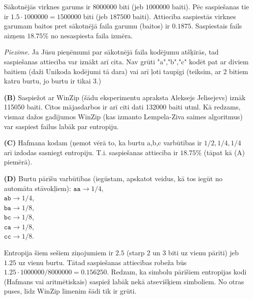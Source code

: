 \documentclass[a4paper]{article}
\begin{document}
Sākotnējās virknes garums ir $8000000$ biti (jeb $1000000$ baiti). 
Pēc saspiešanas tie ir $1.5 \cdot 1000000 = 1500000$ biti 
(jeb $187500$ baiti). 
Attiecība saspiestās virknes garumam baitos pret sākotnējā faila garumu (baitos) 
ir $0.1875$. Saspiestais fails aizņem $18.75\%$ 
no nesaspiesta faila izmēra.

{\em Piezīme.} Ja Jūsu pieņēmumi par sākotnējā faila kodējumu atšķīrās, tad
saspiešanas attiecība var iznākt arī cita. 
Nav grūti "a","b","c" kodēt pat ar diviem baitiem (daži 
Unikoda kodējumi tā dara) vai arī ļoti taupīgi (teiksim, ar 2 bitiem katru burtu, 
jo burtu ir tikai $3$.) 

{\bf (B)} Saspiežot ar WinZip (šādu eksperimentu apraksta
Aleksejs Jelisejevs) iznāk 115050 baiti. Citos 
mājasdarbos ir arī citi dati 132000 baiti utml. 
Kā redzams, vismaz dažos gadījumos WinZip (kas izmanto Lempela-Ziva
saimes algoritmus) var saspiest failus labāk par entropiju. 

{\bf (C)} Hafmana kodam (ņemot vērā to, ka 
burtu a,b,c varbūtības ir $1/2,1/4,1/4$ arī izdodas
sasniegt entropiju. T.i. saspiešanas attiecība ir $18.75\%$ 
(tāpat kā (A) piemērā). 

{\bf (D)} Burtu pārīšu varbūtības (iegūstam, apskatot veidus, kā tos
iegūt no automāta stāvokļiem):
$\mathtt{aa} \rightarrow 1/4$,\\
$\mathtt{ab} \rightarrow 1/4$,\\
$\mathtt{ba} \rightarrow 1/8$,\\
$\mathtt{bc} \rightarrow 1/8$,\\
$\mathtt{ca} \rightarrow 1/8$,\\
$\mathtt{cc} \rightarrow 1/8$.

Entropija šiem sešiem ziņojumiem ir $2.5$ (starp $2$ un $3$ biti 
uz vienu pārīti) jeb $1.25$ uz vienu burtu. 
Tātad saspiešanas attiecības robeža būs 
$1.25 \cdot 1000000 / 8000000 = 0.156250$. 
Redzam, ka simbolu pārīšiem entropijas kodi 
(Hafmans vai aritmētiskais) saspiež labāk nekā atsevišķiem 
simboliem. No otras puses, līdz WinZip līmenim šādi tik ir grūti. 
\end{document}
